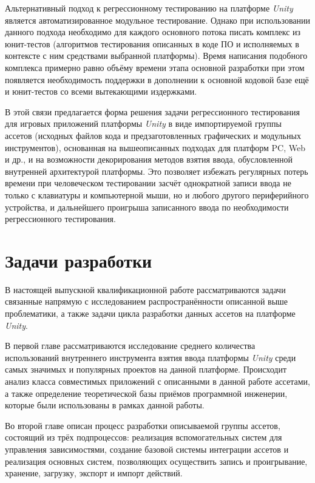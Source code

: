 Альтернативный подход к регрессионному тестированию на платформе \textit{Unity} является автоматизированное модульное тестирование. Однако при использовании данного подхода необходимо для каждого основного потока писать комплекс из юнит-тестов (алгоритмов тестирования описанных в коде ПО и исполняемых в контексте с ним средствами выбранной платформы). Время написания подобного комплекса примерно равно объёму времени этапа основной разработки при этом появляется необходимость поддержки в дополнении к основной кодовой базе ещё и юнит-тестов со всеми вытекающими издержками.

В этой связи предлагается форма решения задачи регрессионного тестирования для игровых приложений платформы \textit{Unity} в виде импортируемой группы ассетов (исходных файлов кода и предзаготовленных графических и модульных инструментов), основанная на вышеописанных подходах для платформ PC, Web и др., и на возможности декорирования методов взятия ввода, обусловленной внутренней архитектурой платформы. Это позволяет избежать регулярных потерь времени при человеческом тестировании засчёт однократной записи ввода не только с клавиатуры и компьютерной мыши, но и любого другого периферийного устройства, и дальнейшего проигрыша записанного ввода по необходимости регрессионного тестирования.

\section*{Задачи разработки}
В настоящей выпускной квалификационной работе рассматриваются задачи связанные напрямую с исследованием распространённости описанной выше проблематики, а также задачи цикла разработки данных ассетов на платформе \textit{Unity}.

В первой главе рассматриваются исследование среднего количества использований внутреннего инструмента взятия ввода платформы \textit{Unity} среди самых значимых и популярных проектов на данной платформе. Происходит анализ класса совместимых приложений с описанными в данной работе ассетами, а также определение теоретической базы приёмов программной инженерии, которые были использованы в рамках данной работы.

Во второй главе описан процесс разработки описываемой группы ассетов, состоящий из трёх подпроцессов: реализация вспомогательных систем для управления зависимостями, создание базовой системы интеграции ассетов и реализация основных систем, позволяющих осуществить запись и проигрывание, хранение, загрузку, экспорт и импорт действий.


